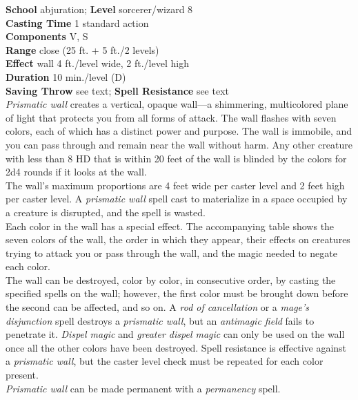\textbf{School} abjuration; \textbf{Level} sorcerer/wizard 8\\
\textbf{Casting Time} 1 standard action\\
\textbf{Components} V, S\\
\textbf{Range} close (25 ft. + 5 ft./2 levels)\\
\textbf{Effect }wall 4 ft./level wide, 2 ft./level high\\
\textbf{Duration} 10 min./level (D)\\
\textbf{Saving Throw} see text; \textbf{Spell Resistance} see text\\
\textit{Prismatic wall }creates a vertical, opaque wall---a shimmering, multicolored plane of light that protects you from all forms of attack. The wall flashes with seven colors, each of which has a distinct power and purpose. The wall is immobile, and you can pass through and remain near the wall without harm. Any other creature with less than 8 HD that is within 20 feet of the wall is blinded by the colors for 2d4 rounds if it looks at the wall.\\
The wall's maximum proportions are 4 feet wide per caster level and 2 feet high per caster level. A \textit{prismatic wall }spell cast to materialize in a space occupied by a creature is disrupted, and the spell is wasted.\\
Each color in the wall has a special effect. The accompanying table shows the seven colors of the wall, the order in which they appear, their effects on creatures trying to attack you or pass through the wall, and the magic needed to negate each color.\\
The wall can be destroyed, color by color, in consecutive order, by casting the specified spells on the wall; however, the first color must be brought down before the second can be affected, and so on. A \textit{rod of cancellation }or a \textit{mage's disjunction }spell destroys a \textit{prismatic wall}, but an \textit{antimagic field }fails to penetrate it. \textit{Dispel magic }and \textit{greater dispel magic }can only be used on the wall once all the other colors have been destroyed. Spell resistance is effective against a \textit{prismatic wall}, but the caster level check must be repeated for each color present.\\
\textit{Prismatic wall }can be made permanent with a \textit{permanency }spell.\\
